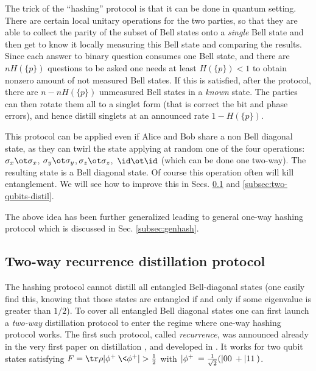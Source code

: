 \documentclass[twocolumn,aps,rmp]{revtex4}
\begin{document}
The trick of the ``hashing'' protocol is that it can be done in
quantum setting. There are certain local unitary operations for the
two parties, so that they are able to collect the parity of the subset
of Bell states onto a {\it single} Bell state and then get to know it
locally measuring this Bell state and comparing the results. Since
each answer to binary question consumes one Bell state, and there are
$nH(\{p\})$ questions to be asked one needs at least $H(\{p\})<1$ to
obtain nonzero amount of not measured Bell states. If this is
satisfied, after the protocol, there are $n- nH(\{p\})$ unmeasured Bell
states in a {\it known} state. The parties can then rotate them all to
a singlet form (that is correct the bit and phase errors), and hence
distill singlets at an announced rate $1-H(\{p\})$.

This protocol can be applied even if Alice and Bob share a non Bell
diagonal state, as they can twirl the state applying at random one of
the four operations: $\sigma_x\ot \sigma_x$, $\sigma_y\ot
\sigma_y$,\,$\sigma_z\ot \sigma_z$,\, $\id\ot \id$ (which can be done
one two-way).  The resulting state is a Bell diagonal state. Of course
this operation often will kill entanglement. We will see how to
improve this in Secs. \ref{subsec:recur} and
\ref{subsec:two-qubits-distil}.

The above idea has been further generalized leading to general one-way
hashing protocol which is discussed in Sec. \ref{subsec:genhash}.


\subsection{Two-way recurrence distillation protocol}
\label{subsec:recur}

The hashing protocol cannot distill all entangled Bell-diagonal
states (one easily find this, knowing that those states are
entangled if and only if some eigenvalue is greater than $1/2$). To
cover all entangled Bell diagonal states one can first launch a {\it
two-way} distillation protocol to enter the regime where one-way
hashing protocol works. The first such protocol, called {\it
recurrence}, was announced already in the very first paper on
distillation \cite{BBPSSW1996}, and developed in \cite{BDSW1996}.
It works for two qubit states satisfying
$F=\tr\rho|\phi^+\>\<\phi^+|>{1\over 2}$ with $|\phi^+\>= {1\over
\sqrt 2}(|00\>+|11\>)$.
\end{document}
